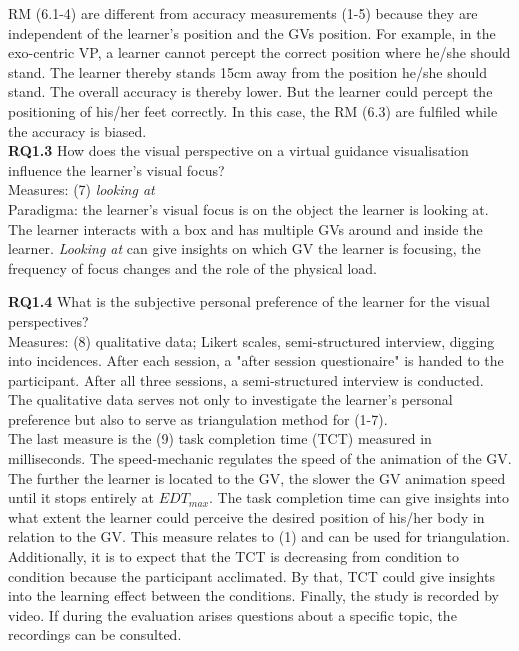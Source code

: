 RM (6.1-4) are different from accuracy measurements (1-5) because they are independent of the learner's position and the GVs position. For example, in the exo-centric VP, a learner cannot percept the correct position where he/she should stand. The learner thereby stands 15cm away from the position he/she should stand. The overall accuracy is thereby lower. But the learner could percept the positioning of his/her feet correctly. In this case, the RM (6.3) are fulfiled while the accuracy is biased.\\

\textbf{RQ1.3} How does the visual perspective on a virtual guidance visualisation influence the learner's visual focus?\\
Measures: (7) \textit{looking at}\\
Paradigma: the learner's visual focus is on the object the learner is looking at.\\
The learner interacts with a box and has multiple GVs around and inside the learner. \textit{Looking at} can give insights on which GV the learner is focusing, the frequency of focus changes and the role of the physical load.

\textbf{RQ1.4} What is the subjective personal preference of the learner for the visual perspectives?\\
Measures: (8) qualitative data; Likert scales, semi-structured interview, digging into incidences. After each session, a "after session questionaire" is handed to the participant. After all three sessions, a semi-structured interview is conducted.\\
The qualitative data serves not only to investigate the learner's personal preference but also to serve as triangulation method for (1-7).\\

The last measure is the (9) task completion time (TCT) measured in milliseconds. The speed-mechanic regulates the speed of the animation of the GV. The further the learner is located to the GV, the slower the GV animation speed until it stops entirely at $EDT_{max}$. The task completion time can give insights into what extent the learner could perceive the desired position of his/her body in relation to the GV. This measure relates to (1) and can be used for triangulation.
Additionally, it is to expect that the TCT is decreasing from condition to condition because the participant acclimated. By that, TCT could give insights into the learning effect between the conditions. Finally, the study is recorded by video. If during the evaluation arises questions about a specific topic, the recordings can be consulted.

